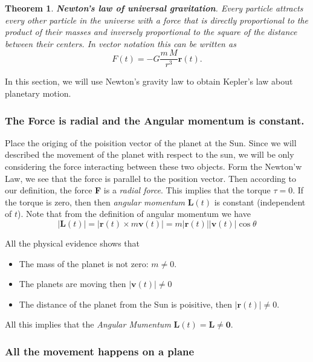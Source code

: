 \documentclass{amsart}
\newtheorem{thm}{Theorem}
\begin{document}
\begin{thm}
\textbf{Newton's law of universal gravitation}. Every particle attracts every other particle in the universe with a force that is directly proportional to the product of their masses and inversely proportional to the square of the distance between their centers. In vector notation this can be written as \[ F(t) = -G \frac{m \, M}{r^3} \mathbf{r}(t). \]
\end{thm}

In this section, we will use Newton's gravity law to obtain Kepler's law about planetary motion.


\subsubsection{The Force is radial and the Angular momentum is constant.}
\label{sec:org4c14495}

Place the origing of the poisition vector of the planet at the Sun. Since we will described the movement of the planet with respect to the sun, we will be only considering 
the force interacting between these two objects. Form the Newton'w Law, we see that the force is parallel to the position vector. Then according to our definition, the force
\textbf{F} is a \emph{radial force}. This implies that the torque \(\tau = 0\). If the torque is zero, then then \emph{angular momentum} \(\mathbf{L}(t)\) is constant (independent of \(t\)).
Note that from the definition of angular momentum we have
\[ |\mathbf{L}(t)| = |\mathbf{r}(t) \times m \mathbf{v}(t)| = m |\mathbf{r}(t)||\mathbf{v}(t)| \cos\theta \]

All the physical evidence shows that
\begin{itemize}
\item The mass of the planet is not zero: \(m\neq 0\).
\item The planets are moving then \(|\mathbf{v}(t)| \neq 0\)
\item The distance of the planet from the Sun is poisitive, then \(|\mathbf{r}(t)| \neq 0\).
\end{itemize}

All this implies that the \emph{Angular Mumentum} \(\mathbf{L}(t) = \mathbf{L} \neq \mathbf{0}\).

\subsubsection{All the movement happens on a plane}
\label{sec:org4dd115a}
\end{document}
